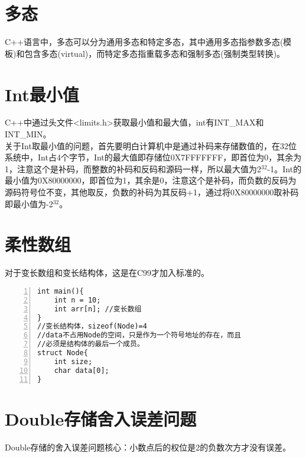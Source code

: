 \section{多态}
C++语言中，多态可以分为通用多态和特定多态，其中通用多态指参数多态(模板)和包含多态(virtual)，而特定多态指重载多态和强制多态(强制类型转换)。

\section{Int最小值}
C++中通过头文件<limits.h>获取最小值和最大值，int有INT\_MAX和INT\_MIN。\\
关于Int取最小值的问题，首先要明白计算机中是通过补码来存储数值的，在32位系统中，Int占4个字节，Int的最大值即存储位0X7FFFFFFF，即首位为0，其余为1，注意这个是补码，而整数的补码和反码和源码一样，所以最大值为2$^{32}$-1。Int的最小值为0X80000000，即首位为1，其余是0，注意这个是补码，而负数的反码为源码符号位不变，其他取反，负数的补码为其反码+1，通过将0X80000000取补码即最小值为-2$^{32}$。

\section{柔性数组}
对于变长数组和变长结构体，这是在C99才加入标准的。
\begin{lstlisting}[language={[ANSI]C},numbers=left,numberstyle=\tiny,%frame=shadowbox,
   rulesepcolor=\color{red!20!green!20!blue!20},
   keywordstyle=\color{blue!70!black},
   commentstyle=\color{blue!90!},
   basicstyle=\ttfamily]
int main(){
	int n = 10;
	int arr[n]; //变长数组
}
//变长结构体，sizeof(Node)=4
//data不占用Node的空间，只是作为一个符号地址的存在，而且
//必须是结构体的最后一个成员。
struct Node{
	int size;
	char data[0];
}
\end{lstlisting}

\section{Double存储舍入误差问题}
Double存储的舍入误差问题核心：小数点后的权位是2的负数次方才没有误差。

